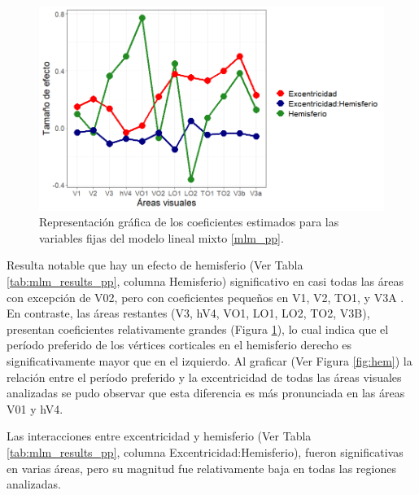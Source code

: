 \begin{figure}[h]
	\centering
	\includegraphics[scale=0.6]{Graphics/effect_size_coef_pp}
	\caption{Representación gráfica de los coeficientes estimados para las variables fijas del modelo lineal mixto \ref{mlm_pp}.}
	\label{fig:coeff}
\end{figure}

Resulta notable que hay un efecto de hemisferio (Ver Tabla \ref{tab:mlm_results_pp}, columna Hemisferio) significativo en casi todas las áreas con excepción de V02, pero con coeficientes pequeños en V1, V2, TO1, y V3A . En contraste, las \'areas restantes (V3, hV4, VO1, LO1, LO2, TO2, V3B), presentan coeficientes relativamente grandes (Figura \ref{fig:coeff}), lo cual indica que  el per\'iodo preferido de los v\'ertices corticales en el hemisferio derecho es significativamente mayor que en el izquierdo. Al graficar (Ver Figura \ref{fig:hem}) la relaci\'on entre el per\'iodo preferido y la excentricidad de todas las \'areas visuales analizadas se pudo observar que esta diferencia es m\'as pronunciada en las \'areas V01 y hV4. 

Las interacciones entre excentricidad y hemisferio (Ver Tabla \ref{tab:mlm_results_pp}, columna Excentricidad:Hemisferio), fueron significativas en varias áreas, pero su magnitud fue relativamente baja en todas las regiones analizadas.

